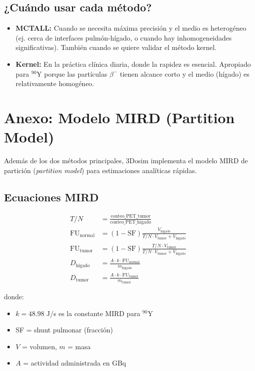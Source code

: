 \documentclass[12pt,a4paper]{article}
\begin{document}
\subsection{¿Cuándo usar cada método?}

\begin{itemize}
    \item \textbf{MCTALL:} Cuando se necesita máxima precisión y el medio
        es heterogéneo (ej. cerca de interfaces pulmón-hígado, o cuando
        hay inhomogeneidades significativas). También cuando se quiere
        validar el método kernel.
    \item \textbf{Kernel:} En la práctica clínica diaria, donde la rapidez
        es esencial. Apropiado para $^{90}$Y porque las partículas $\beta^-$
        tienen alcance corto y el medio (hígado) es relativamente homogéneo.
\end{itemize}

\section{Anexo: Modelo MIRD (Partition Model)}

Además de los dos métodos principales, 3Dosim implementa el modelo MIRD
de partición (\emph{partition model}) para estimaciones analíticas rápidas.

\subsection{Ecuaciones MIRD}

\begin{align}
    T/N &= \frac{\text{conteo\_PET\_tumor}}{\text{conteo\_PET\_higado}} \\
    \text{FU}_{\text{normal}} &= (1 - \text{SF}) \frac{V_{\text{hígado}}}{T/N \cdot V_{\text{tumor}} + V_{\text{hígado}}} \\
    \text{FU}_{\text{tumor}} &= (1 - \text{SF}) \frac{T/N \cdot V_{\text{tumor}}}{T/N \cdot V_{\text{tumor}} + V_{\text{hígado}}} \\
    D_{\text{hígado}} &= \frac{A \cdot k \cdot \text{FU}_{\text{normal}}}{m_{\text{hígado}}} \\
    D_{\text{tumor}} &= \frac{A \cdot k \cdot \text{FU}_{\text{tumor}}}{m_{\text{tumor}}}
\end{align}

donde:
\begin{itemize}
    \item $k = 48.98$ J/s es la constante MIRD para $^{90}$Y
    \item SF = shunt pulmonar (fracción)
    \item $V$ = volumen, $m$ = masa
    \item $A$ = actividad administrada en GBq
\end{itemize}
\end{document}
